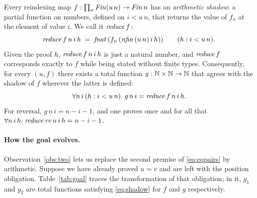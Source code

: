 \documentclass{fundam}
\begin{document}
\begin{observation}\label{obs:two}
  Every reindexing map $f : \prod_n \mathit{Fin}(u\,n) \to \mathit{Fin}\,n$ has an \emph{arithmetic
  shadow}: a partial function on numbers, defined on $i < u\,n$, that returns the value
  of $f_n$ at the element of value $i$.  We call it $\mathit{reduce}\,f$:
  \begin{equation}\label{eq:reduce}
    \mathit{reduce}\,f\,n\,i\,h \;=\; \mathit{fnat}\,(f_n\,(\mathit{nfin}\,(u\,n)\,i\,h))
    \qquad (h : i < u\,n).
  \end{equation}
  Given the proof $h$, $\mathit{reduce}\,f\,n\,i\,h$ is just a natural number, and
  $\mathit{reduce}\,f$ corresponds exactly to $f$ while being stated without finite types.
  Consequently, for every $(u, f)$ there exists a total function $g : \mathbb{N} \times \mathbb{N} \to \mathbb{N}$
  that agrees with the shadow of $f$ wherever the latter is defined:
  \begin{equation}\label{eq:shadow}
    \forall n\,i\,(h : i < u\,n).\; g\,n\,i = \mathit{reduce}\,f\,n\,i\,h .
  \end{equation}
  For reversal, $g\,n\,i = n - i - 1$, and one proves once and for all that
  $\forall n\,i\,h.\; \mathit{reduce}\,\mathit{rv}\,n\,i\,h = n - i - 1$.
\end{observation}

\paragraph{How the goal evolves.}  Observation~\ref{obs:two} lets us replace the second
premise of \eqref{eq:eqpairs} by arithmetic.  Suppose we have already proved $u = v$ and
are left with the position obligation.  Table~\ref{tab:goal} traces the transformation of
that obligation; in it, $g_1$ and $g_2$ are total functions satisfying \eqref{eq:shadow}
for $f$ and $g$ respectively.
\end{document}
